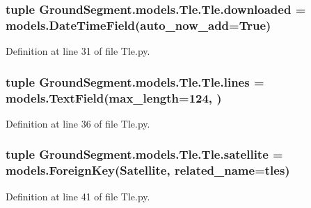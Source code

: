 \subsubsection[{downloaded}]{\setlength{\rightskip}{0pt plus 5cm}tuple Ground\+Segment.\+models.\+Tle.\+Tle.\+downloaded = models.\+Date\+Time\+Field(auto\+\_\+now\+\_\+add=True)\hspace{0.3cm}{\ttfamily [static]}}\label{class_ground_segment_1_1models_1_1_tle_1_1_tle_ae3785c68a686c40d0505afe276d13d04}


Definition at line 31 of file Tle.\+py.

\hypertarget{class_ground_segment_1_1models_1_1_tle_1_1_tle_ac5a4980b37f61f042cb30d0a268755eb}{}
\subsubsection[{lines}]{\setlength{\rightskip}{0pt plus 5cm}tuple Ground\+Segment.\+models.\+Tle.\+Tle.\+lines = models.\+Text\+Field(max\+\_\+length=124, )\hspace{0.3cm}{\ttfamily [static]}}\label{class_ground_segment_1_1models_1_1_tle_1_1_tle_ac5a4980b37f61f042cb30d0a268755eb}


Definition at line 36 of file Tle.\+py.

\hypertarget{class_ground_segment_1_1models_1_1_tle_1_1_tle_a95bfe88e371279e78d31945379bd3785}{}
\subsubsection[{satellite}]{\setlength{\rightskip}{0pt plus 5cm}tuple Ground\+Segment.\+models.\+Tle.\+Tle.\+satellite = models.\+Foreign\+Key({\bf Satellite}, related\+\_\+name=\textquotesingle{}tles\textquotesingle{})\hspace{0.3cm}{\ttfamily [static]}}\label{class_ground_segment_1_1models_1_1_tle_1_1_tle_a95bfe88e371279e78d31945379bd3785}


Definition at line 41 of file Tle.\+py.

\hypertarget{class_ground_segment_1_1models_1_1_tle_1_1_tle_a66ec63c8a5d9f0a43b9aa48993e531a6}{}
